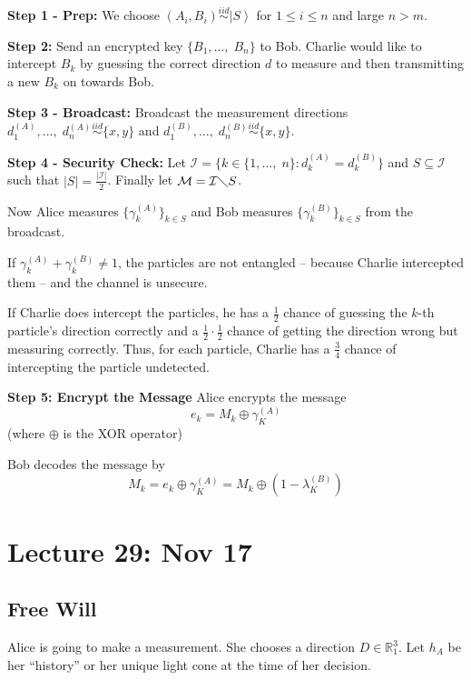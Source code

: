 \documentclass[12pt]{article}
\newcommand{\R}{\mathbb{R}}
\newcommand{\ket}[1]{\left\vert #1 \right\rangle}
\newcommand{\abs}[1]{\left\vert #1 \right\vert}
\begin{document}
        \textbf{Step 1 - Prep:} We choose $(A_i, B_i) \overset{iid}{\sim} \ket{S}$ for $1 \leq i \leq n$ and large $n > m$.
        
        \textbf{Step 2:} Send an encrypted key $\{B_1, \dots,\; B_n\}$ to Bob. Charlie would like to intercept $B_k$ by guessing the correct direction $d$ to measure and then transmitting a new $B_k$ on towards Bob. 

        \textbf{Step 3 - Broadcast:} Broadcast the measurement directions $d_1^{(A)}, \dots,\; d_n^{(A)} \overset{iid}{\sim} \{x, y\}$ and $d_1^{(B)}, \dots,\; d_n^{(B)} \overset{iid}{\sim} \{x, y\}$.

        \textbf{Step 4 - Security Check:} Let $\mathcal{I} = \{k \in \{1, \dots,\; n\} : d_k^{(A)} = d_k^{(B)}\}$ and $S \subseteq \mathcal{I}$ such that $\abs{S} = \frac{\abs{\mathcal I}}{2}$. Finally let $\mathcal{M} = \mathcal{I} \diagdown S$. 

        Now Alice measures $\{\gamma_{k}^{(A)}\}_{k\in S}$ and Bob measures $\{\gamma_{k}^{(B)}\}_{k\in S}$ from the broadcast.  

        If $\gamma_{k}^{(A)} + \gamma_{k}^{(B)} \neq 1$, the particles are not entangled -- because Charlie intercepted them -- and the channel is unsecure. 

        If Charlie does intercept the particles, he has a $\frac{1}{2}$ chance of guessing the $k$-th particle's direction correctly and a $\frac{1}{2} \cdot \frac{1}{2}$ chance of getting the direction wrong but measuring correctly. Thus, for each particle, Charlie has a $\frac{3}{4}$ chance of intercepting the particle undetected. 

        \textbf{Step 5: Encrypt the Message}
        Alice encrypts the message 
        \[e_k = M_k \oplus \gamma_K^{(A)}\]
        (where $\oplus$ is the XOR operator)

        Bob decodes the message by 
        \[M_k = e_k \oplus \gamma_K^{(A)} = M_k \oplus (1 - \lambda_K^{(B)})\]

\section*{Lecture 29: Nov 17}
    \subsection*{Free Will}
        Alice is going to make a measurement. She chooses a direction $D \in \R_1^3$. Let $h_A$ be her ``history'' or her unique light cone at the time of her decision. 
\end{document}
